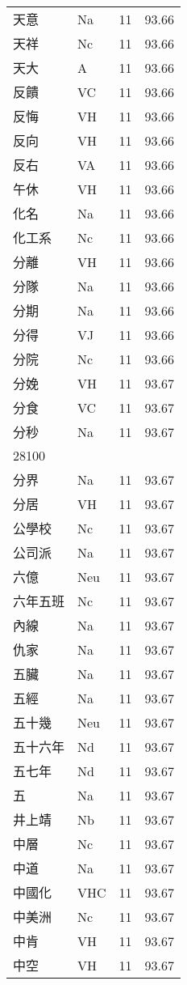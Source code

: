 \documentclass[twocolumn]{book}
\begin{document}
\begin{supertabular}{llrr}
天意 & Na & 11 &  93.66\\
天祥 & Nc & 11 &  93.66\\
天大 & A & 11 &  93.66\\
反饋 & VC & 11 &  93.66\\
反悔 & VH & 11 &  93.66\\
反向 & VH & 11 &  93.66\\
反右 & VA & 11 &  93.66\\
午休 & VH & 11 &  93.66\\
化名 & Na & 11 &  93.66\\
化工系 & Nc & 11 &  93.66\\
分離 & VH & 11 &  93.66\\
分隊 & Na & 11 &  93.66\\
分期 & Na & 11 &  93.66\\
分得 & VJ & 11 &  93.66\\
分院 & Nc & 11 &  93.66\\
分娩 & VH & 11 &  93.67\\
分食 & VC & 11 &  93.67\\
分秒 & Na & 11 &  93.67\\
28100\\
分界 & Na & 11 &  93.67\\
分居 & VH & 11 &  93.67\\
公學校 & Nc & 11 &  93.67\\
公司派 & Na & 11 &  93.67\\
六億 & Neu & 11 &  93.67\\
六年五班 & Nc & 11 &  93.67\\
內線 & Na & 11 &  93.67\\
仇家 & Na & 11 &  93.67\\
五臟 & Na & 11 &  93.67\\
五經 & Na & 11 &  93.67\\
五十幾 & Neu & 11 &  93.67\\
五十六年 & Nd & 11 &  93.67\\
五七年 & Nd & 11 &  93.67\\
五 & Na & 11 &  93.67\\
井上靖 & Nb & 11 &  93.67\\
中層 & Nc & 11 &  93.67\\
中道 & Na & 11 &  93.67\\
中國化 & VHC & 11 &  93.67\\
中美洲 & Nc & 11 &  93.67\\
中肯 & VH & 11 &  93.67\\
中空 & VH & 11 &  93.67\\

\end{supertabular}
\end{document}
